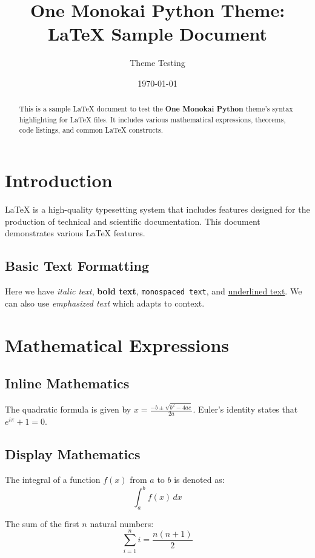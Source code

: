 \documentclass[12pt,a4paper]{article}
\title{One Monokai Python Theme: \\ LaTeX Sample Document}
\author{Theme Testing}
\date{\today}
\theoremstyle{definition}
\theoremstyle{remark}
\begin{document}
\maketitle

\begin{abstract}
This is a sample \LaTeX{} document to test the \textbf{One Monokai Python} theme's syntax highlighting for \LaTeX{} files. It includes various mathematical expressions, theorems, code listings, and common \LaTeX{} constructs.
\end{abstract}

\tableofcontents

\section{Introduction}

\LaTeX{} is a high-quality typesetting system that includes features designed for the production of technical and scientific documentation. This document demonstrates various \LaTeX{} features.

\subsection{Basic Text Formatting}

Here we have \textit{italic text}, \textbf{bold text}, \texttt{monospaced text}, and \underline{underlined text}. We can also use \emph{emphasized text} which adapts to context.

\section{Mathematical Expressions}

\subsection{Inline Mathematics}

The quadratic formula is given by $x = \frac{-b \pm \sqrt{b^2 - 4ac}}{2a}$. Euler's identity states that $e^{i\pi} + 1 = 0$.

\subsection{Display Mathematics}

The integral of a function $f(x)$ from $a$ to $b$ is denoted as:
\[
\int_a^b f(x) \, dx
\]

The sum of the first $n$ natural numbers:
\begin{equation}
\sum_{i=1}^{n} i = \frac{n(n+1)}{2}
\label{eq:sum}
\end{equation}
\end{document}
